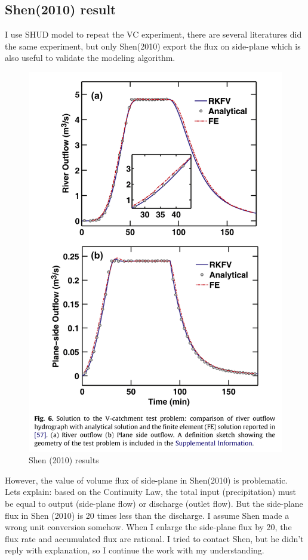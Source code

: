 \documentclass[]{scrbook}
\begin{document}
\subsection{Shen(2010) result}\label{shen2010-result}

I use SHUD model to repeat the VC experiment, there are several
literatures did the same experiment, but only Shen(2010) export the flux
on side-plane which is also useful to validate the modeling algorithm.

\begin{figure}
\centering
\includegraphics{Fig/Example/vCat/Shen2010.png}
\caption{Shen (2010) results}
\end{figure}

However, the value of volume flux of side-plane in Shen(2010) is
problematic. Lets explain: based on the Continuity Law, the total input
(precipitation) must be equal to output (side-plane flow) or discharge
(outlet flow). But the side-plane flux in Shen (2010) is 20 times less
than the discharge. I assume Shen made a wrong unit conversion somehow.
When I enlarge the side-plane flux by 20, the flux rate and accumulated
flux are rational. I tried to contact Shen, but he didn't reply with
explanation, so I continue the work with my understanding.
\end{document}
